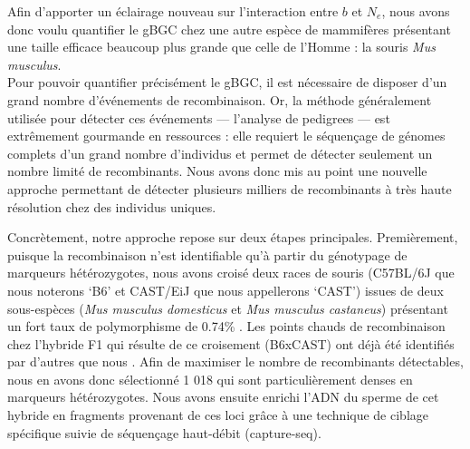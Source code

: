 {Afin d'apporter un éclairage nouveau sur l'interaction entre $b$ et $N_e$, nous avons donc voulu quantifier le gBGC chez une autre espèce de mammifères présentant une taille efficace beaucoup plus grande que celle de l'Homme \citep{geraldes2008inferring,phifer-rixey2012adaptive,davies2015factors}: la souris \textit{Mus musculus}.\\


Pour pouvoir quantifier précisément le gBGC, il est nécessaire de disposer d'un grand nombre d'événements de recombinaison.
Or, la méthode généralement utilisée pour détecter ces événements — l'analyse de pedigrees — est extrêmement gourmande en ressources : 
elle requiert le séquençage de génomes complets d'un grand nombre d'individus et permet de détecter seulement un nombre limité de recombinants.
Nous avons donc mis au point une nouvelle approche permettant de détecter plusieurs milliers de recombinants à très haute résolution chez des individus uniques.

Concrètement, notre approche repose sur deux étapes principales.
Premièrement, puisque la recombinaison n'est identifiable qu'à partir du génotypage de marqueurs hétérozygotes, nous avons croisé deux races de souris (C57BL/6J que nous noterons ‘B6’ et CAST/EiJ que nous appellerons ‘CAST’) issues de deux sous-espèces (\textit{Mus musculus domesticus} et \textit{Mus musculus castaneus}) présentant un fort taux de polymorphisme de 0.74\% \citep{keane2011mouse,yalcin2012nextgeneration}.
Les points chauds de recombinaison chez l'hybride F1 qui résulte de ce croisement (B6xCAST) ont déjà été identifiés par d'autres que nous \citep{baker2015prdm9}.
Afin de maximiser le nombre de recombinants détectables, nous en avons donc sélectionné 1 018 qui sont particulièrement denses en marqueurs hétérozygotes.
Nous avons ensuite enrichi l'ADN du sperme de cet hybride en fragments provenant de ces loci gr\^ace à une technique de ciblage spécifique suivie de séquençage haut-débit (capture-seq).

}
